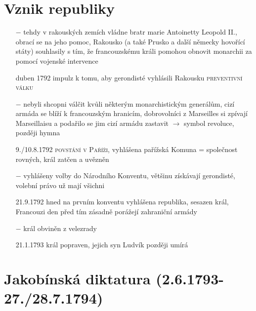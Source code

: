 \documentclass{article}
\begin{document}
\section*{Vznik republiky}
\begin{itemize}
    \vspace{-0.5em}
    \setlength\itemsep{0.15em}
    \item[$-$] tehdy v rakouských zemích vládne bratr marie Antoinetty Leopold II., obrací se na jeho pomoc, Rakousko (a také Prusko a další německy hovořící státy) souhlasily s tím, že francouzskému králi pomohou obnovit monarchii za pomocí vojenské intervence
    \item[duben 1792] impulz k tomu, aby gerondisté vyhlásili Rakousku \textsc{preventivní válku}
    \item[$-$] nebyli shcopni válčit kvůli některým monarchistickým generálům, cizí armáda se blíží k francouzským hranicím, dobrovolníci z Marseilles si zpívají Marseillaisu a podařilo se jim cizí armádu zastavit $\rightarrow$ symbol revoluce, později hymna
    \item[9./10.8.1792] \textsc{povstání v Paříži}, vyhlášena pařížská Komuna = společnost rovných, král zatčen a uvězněn
    \item[$-$] vyhlášeny volby do Národního Konventu, většinu získávají gerondisté, volební právo už mají všichni
    \item[21.9.1792] hned na prvním konventu vyhlášena republika, sesazen král, Francouzi den před tím zásadně porážejí zahraniční armády
    \item[$-$] král obviněn z velezrady
    \item[21.1.1793] král popraven, jejich syn Ludvík později umírá
\end{itemize}
\section*{Jakobínská diktatura (2.6.1793-27./28.7.1794)}
\end{document}
